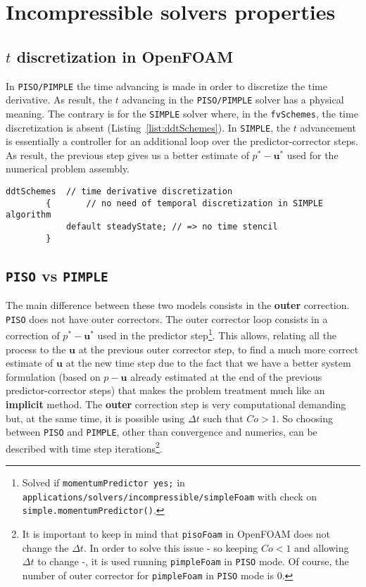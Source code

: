 \section{Incompressible solvers properties} \label{app:app1}
\subsection{$t$ discretization in OpenFOAM}
In \verb|PISO/PIMPLE| the time advancing is made in order to discretize the time derivative. As result, the $t$ advancing in the \verb|PISO/PIMPLE| solver has a physical meaning. The contrary is for the \verb|SIMPLE| solver where, in the \verb|fvSchemes|, the time discretization is absent (Listing~\ref{list:ddtSchemes}). In \verb|SIMPLE|, the $t$ advancement is essentially a controller for an additional loop over the predictor-corrector steps. As result, the previous step gives us a better estimate of $p^* - \boldsymbol{u}^*$ used for the numerical problem assembly.

\begin{lstlisting}[caption = $\mathtt{combustorSimple/system/fvSchemes}$ time discretization., label = list:ddtSchemes]
    ddtSchemes  // time derivative discretization 
        {       // no need of temporal discretization in SIMPLE algorithm
            default steadyState; // => no time stencil 
        }
    \end{lstlisting}

\cprotect\subsection{\verb|PISO| vs \verb|PIMPLE|}
The main difference between these two models consists in the \textbf{outer} correction. \verb|PISO| does not have outer correctors. The outer corrector loop consists in a correction of $p^* - \boldsymbol{u}^*$ used in the predictor step\cprotect\footnote{Solved if \verb|momentumPredictor yes;| in \verb|applications/solvers/incompressible/simpleFoam| with check on \verb|simple.momentumPredictor()|.}. This allows, relating all the process to the $\boldsymbol{u}$ at the previous outer corrector step, to find a much more correct estimate of $\boldsymbol{u}$ at the new time step due to the fact that we have a better system formulation (based on $p - \boldsymbol{u}$ already estimated at the end of the previous predictor-corrector steps) that makes the problem treatment much like an \textbf{implicit} method. The \textbf{outer} correction step is very computational demanding but, at the same time, it is possible using $\Delta t$ such that $Co > 1$. So choosing between \verb|PISO| and \verb|PIMPLE|, other than convergence and numerics, can be described with time step iterations\cprotect\footnote{It is important to keep in mind that \verb|pisoFoam| in OpenFOAM does not change the $\Delta t$. In order to solve this issue - so keeping $Co < 1$ and allowing $\Delta t$ to change -, it is used running \verb|pimpleFoam| in \verb|PISO| mode. Of course, the number of outer corrector for \verb|pimpleFoam| in \verb|PISO| mode is $0$.}.  


